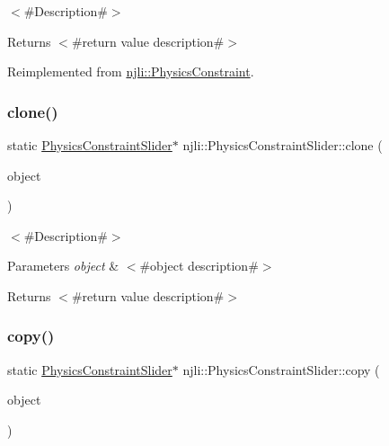$<$\#\+Description\#$>$

\begin{DoxyReturn}{Returns}
$<$\#return value description\#$>$ 
\end{DoxyReturn}


Reimplemented from \mbox{\hyperlink{classnjli_1_1_physics_constraint_aeda6c35ab271897cfe3192870d4ac7a4}{njli\+::\+Physics\+Constraint}}.

\mbox{\label{classnjli_1_1_physics_constraint_slider_a40db75b41a6eaac15127312ab15a8d04}} 
\subsubsection{\texorpdfstring{clone()}{clone()}}
{\footnotesize\ttfamily static \mbox{\hyperlink{classnjli_1_1_physics_constraint_slider}{Physics\+Constraint\+Slider}}$\ast$ njli\+::\+Physics\+Constraint\+Slider\+::clone (\begin{DoxyParamCaption}\item[{const \mbox{\hyperlink{classnjli_1_1_physics_constraint_slider}{Physics\+Constraint\+Slider}} \&}]{object }\end{DoxyParamCaption})\hspace{0.3cm}{\ttfamily [static]}}

$<$\#\+Description\#$>$


\begin{DoxyParams}{Parameters}
{\em object} & $<$\#object description\#$>$\\
\hline
\end{DoxyParams}
\begin{DoxyReturn}{Returns}
$<$\#return value description\#$>$ 
\end{DoxyReturn}
\mbox{\label{classnjli_1_1_physics_constraint_slider_acb1f1dffeec353b98d5edf9597b42a58}} 
\subsubsection{\texorpdfstring{copy()}{copy()}}
{\footnotesize\ttfamily static \mbox{\hyperlink{classnjli_1_1_physics_constraint_slider}{Physics\+Constraint\+Slider}}$\ast$ njli\+::\+Physics\+Constraint\+Slider\+::copy (\begin{DoxyParamCaption}\item[{const \mbox{\hyperlink{classnjli_1_1_physics_constraint_slider}{Physics\+Constraint\+Slider}} \&}]{object }\end{DoxyParamCaption})\hspace{0.3cm}{\ttfamily [static]}}

